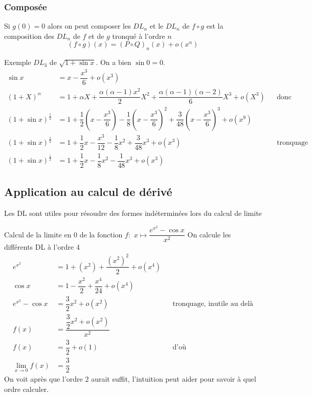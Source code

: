 \documentclass[11pt,colorlinks]{book}
\theoremstyle{mytheoremstyle}
\theoremstyle{mytheoremstyle}
\theoremstyle{mytheoremstyle}
\theoremstyle{mytheoremstyle}
\theoremstyle{mytheoremstyle}
\theoremstyle{mytheoremstyle}
\theoremstyle{mytheoremstyle}
\theoremstyle{mytheoremstyle}
\theoremstyle{myproblemstyle}
\begin{document}
  \subsubsection{Composée}
  \begin{prop}
    Si $g(0) = 0$ alors on peut composer les $DL_n$ et le $DL_n$ de $f \circ g$ est la composition des $DL_n$ de $f$ et de $g$ tronqué à l'ordre $n$
    \begin{equation*}
      (f\circ g)(x) = (P \circ Q)_{n}(x) + o(x^n)
    \end{equation*}
  \end{prop}
  \begin{ex}
    Exemple $DL_3$ de $\sqrt{1 + \sin x}$. On a bien $\sin 0 = 0$.
    \begin{align*}
      \sin x &= x - \dfrac{x^3}{6} + o(x^3) \\ 
      (1+X)^{\alpha} &= 1 + \alpha X + \dfrac{\alpha(\alpha-1)x^2}{2} X^2 + \dfrac{\alpha(\alpha-1)(\alpha-2)}{6} X^3 + o(X^3) && \text{donc} \\ 
      (1 + \sin x)^{\frac{1}{2}} &= 1 + \dfrac{1}{2} \left(x - \dfrac{x^3}{6}\right) - \dfrac{1}{8} \left(x - \dfrac{x^3}{6}\right)^2 + \dfrac{3}{48} \left(x - \dfrac{x^3}{6}\right)^3 + o(x^9) \\ 
      (1 + \sin x)^{\frac{1}{2}} &= 1 + \dfrac{1}{2} x - \dfrac{x^3}{12} - \dfrac{1}{8} x^2 + \dfrac{3}{48} x^3 + o(x^3) && \text{tronquage} \\ 
      (1 + \sin x)^{\frac{1}{2}} &= 1 + \dfrac{1}{2} x - \dfrac{1}{8} x^2 - \dfrac{1}{48} x^3 + o(x^3) 
    \end{align*}
  \end{ex}
  \subsection{Application au calcul de dérivé}
  Les DL sont utiles pour résoudre des formes indéterminées lors du calcul de limite 
  \begin{ex}
    Calcul de la limite en 0 de la fonction $f : $ $x \mapsto \dfrac{e^{x^2} - \cos x}{x^2}$  
    On calcule les différents DL à l'ordre 4
    \begin{align*}
      e^{x^2} &= 1 + (x^2) + \dfrac{(x^2)^2}{2} + o(x^4) \\
      \cos x &= 1 - \dfrac{x^2}{2} + \dfrac{x^4}{24} + o(x^4) \\
      e^{x^2} - \cos x &= \dfrac{3}{2}x^2 + o(x^2) && \text{tronquage, inutile au delà} \\ 
      f(x) &= \dfrac{\dfrac{3}{2}x^2 + o(x^2)}{x^2} \\ 
      f(x) &= \dfrac{3}{2} + o(1) && \text{d'où} \\
      \lim_{x \to 0} f(x) &= \dfrac{3}{2}
    \end{align*}
    On voit après que l'ordre 2 aurait suffit, l'intuition peut aider pour savoir à quel ordre calculer.
  \end{ex}
\end{document}
